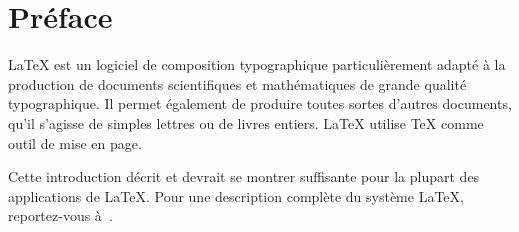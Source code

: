 



\chapter{Préface}
\thispagestyle{plain}

\LaTeX{} \cite{manual} est un logiciel de composition typographique
particulièrement adapté à la production de documents scientifiques et mathématiques de
grande qualité typographique. Il permet également de produire
toutes sortes d'autres documents, qu'il s'agisse de simples lettres ou
de livres entiers. \LaTeX{} utilise \TeX{} \cite{texbook} comme outil de
mise en page.

Cette introduction décrit \LaTeXe{} et devrait se montrer suffisante
pour la plupart des applications de \LaTeX. Pour une description
complète du système \LaTeX{}, reportez-vous
à~\cite{manual,companion}.

